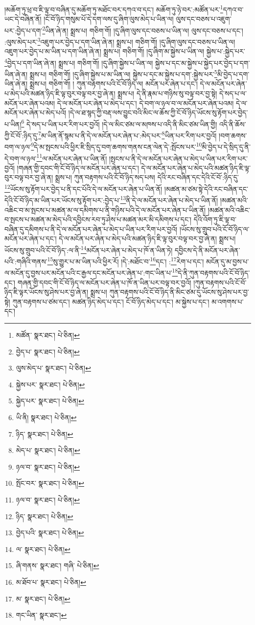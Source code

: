 །མཆོག་ཏུ་ཕྲ་བ་ཇི་ལྟ་བ་བཞིན་དུ་མཆོག་ཏུ་མཐོང་བར་དཀའ་བ་དང་། མཆོག་ཏུ་ཉེ་བར་:མཚོན་པར་\footnote{མཚོན་  སྣར་ཐང་།  པེ་ཅིན། }དཀའ་བ་ཡང་དེ་བཞིན་ནོ། །ངོ་བོ་ཉིད་གསུམ་པོ་དེ་དག་ལས་དུ་ཞིག་ལུས་མེད་པ་ཡིན་ལ། ལུས་དང་བཅས་པ་འཇུག་པར་:བྱེད་པ་དག་\footnote{བྱེད་པ་  སྣར་ཐང་།  པེ་ཅིན། }ཡིན་ཞེ་ན། སྨྲས་པ། གཅིག་གོ། །དུ་ཞིག་ལུས་དང་བཅས་པ་ཡིན་ལ། ལུས་དང་བཅས་པ་དང་། :ལུས་མེད་པར་\footnote{ལུས་མེད་པ་  སྣར་ཐང་།  པེ་ཅིན། }འཇུག་པར་བྱེད་པ་དག་ཡིན་ཞེ་ན། སྨྲས་པ། གཅིག་གོ། །དུ་ཞིག་ལུས་དང་བཅས་པ་ཡིན་ལ། འཇུག་པར་བྱེད་པ་མ་ཡིན་པ་དག་ཡིན་ཞེ་ན། སྨྲས་པ། གཅིག་གོ། །དུ་ཞིག་མ་སྐྱེས་པ་ཡིན་ལ། སྐྱེས་པ་:སྐྱེད་པར་\footnote{སྐྱེས་པར་  སྣར་ཐང་།  པེ་ཅིན། }བྱེད་པ་དག་ཡིན་ཞེ་ན། སྨྲས་པ། གཅིག་གོ། །དུ་ཞིག་སྐྱེས་པ་ཡིན་ལ། སྐྱེས་པ་དང་མ་སྐྱེས་པ་སྐྱེད་པར་བྱེད་པ་དག་ཡིན་ཞེ་ན། སྨྲས་པ། གཅིག་གོ། །དུ་ཞིག་སྐྱེས་པ་མ་ཡིན་ལ། སྐྱེས་པ་དང་མ་སྐྱེས་པ་དག་:སྐྱེས་པར་\footnote{སྐྱེད་པར་  སྣར་ཐང་།  པེ་ཅིན། }མི་བྱེད་པ་དག་ཡིན་ཞེ་ན། སྨྲས་པ། གཅིག་གོ། །
ཀུན་བརྟགས་པའི་ངོ་བོ་ཉིད་ལ། མངོན་པར་ཞེན་པ་དང་། དེ་ལ་མངོན་པར་ཞེན་པ་མེད་པའི་མཚན་ཉིད་ཇི་ལྟ་བུར་བལྟ་བར་བྱ་ཞེ་ན། སྨྲས་པ། དེ་ནི་རྣམ་པ་གཉིས་སུ་བལྟ་བར་བྱ་སྟེ། དེ་སད་པ་ལ་མངོན་པར་ཞེན་པའམ། དེ་ལ་མངོན་པར་ཞེན་པ་མེད་པ་དང་། དེ་བག་ལ་ཉལ་བ་ལ་མངོན་པར་ཞེན་པའམ། དེ་ལ་མངོན་པར་ཞེན་པ་མེད་པའོ། །དེ་ལ་ཐ་སྙད་ཀྱི་བརྡ་ལས་བྱུང་བའི་མིང་ལ་ཆོས་ཀྱི་ངོ་བོ་ཉིད་ཡོངས་སུ་རྟོག་པར་བྱེད་པ་ཡིན།\footnote{ཡི་ནི།  སྣར་ཐང་།  པེ་ཅིན། } དེ་སད་པ་ཡིན་པར་རིག་པར་བྱའོ། །དེ་ལ་མིང་ཙམ་ལ་མཁས་པ་འདི་ནི་མིང་ཙམ་ཡིན་གྱི། འདི་ནི་ཆོས་ཀྱི་ངོ་བོ་:ཉིད་དུ་\footnote{ཉིད་  སྣར་ཐང་།  པེ་ཅིན། }མ་ཡིན་ནོ་སྙམ་པ་ནི་དེ་ལ་མངོན་པར་ཞེན་པ་:མེད་པར་\footnote{མེད་པ་  སྣར་ཐང་།  པེ་ཅིན། }ཡིན་པར་རིག་པར་བྱའོ། །བག་ཆགས་བག་ལ་ཉལ་\footnote{ཉལ་བ་  སྣར་ཐང་།  པེ་ཅིན། }དེ་མ་སྤངས་པའི་ཕྱིར་ཇི་སྲིད་དུ་བག་ཆགས་གནས་ངན་ལེན་དེ་:སྤོངས་པར་\footnote{སྤོང་བར་  སྣར་ཐང་།  པེ་ཅིན། }མི་བྱེད་པ་དེ་སྲིད་དུ་ནི་དེ་བག་ལ་ཉལ་\footnote{ཉལ་བ་  སྣར་ཐང་།  པེ་ཅིན། }ལ་མངོན་པར་ཞེན་པ་ཡིན་ནོ། །སྤངས་པ་ནི་དེ་ལ་མངོན་པར་ཞེན་པ་མེད་པ་ཡིན་པར་རིག་པར་བྱའོ། །གཞན་གྱི་དབང་གི་ངོ་བོ་ཉིད་ལ་མངོན་པར་ཞེན་པ་དང་། དེ་ལ་མངོན་པར་ཞེན་པ་མེད་པའི་མཚན་ཉིད་ཇི་ལྟ་བུར་བལྟ་བར་བྱ་ཞེ་ན། སྨྲས་པ། ཀུན་བརྟགས་པའི་ངོ་བོ་ཉིད་སད་པས། དེའི་རང་བཞིན་དང་དེའི་ངོ་བོ་:ཉིད་དུ་\footnote{ཉིད་  སྣར་ཐང་།  པེ་ཅིན། }ཡོངས་སུ་རྟོག་པར་བྱེད་པ་ནི་དང་པོའི་དེ་ལ་མངོན་པར་ཞེན་པ་ཡིན་ནོ། །མཚན་མ་ཙམ་སྟེ་དེའི་རང་བཞིན་དང་དེའི་ངོ་བོ་ཉིད་མ་ཡིན་པར་ཡོངས་སུ་རྟོག་པར་:བྱེད་པ་\footnote{བྱེད་པའི་  སྣར་ཐང་།  པེ་ཅིན། }ནི་དེ་ལ་མངོན་པར་ཞེན་པ་མེད་པ་ཡིན་ནོ། །མཚན་མའི་འཆིང་བ་མ་སྤངས་པ་མཚན་མ་ལ་དམིགས་པ་ནི་གཉིས་པའི་དེ་ལ་མངོན་པར་ཞེན་པ་ཡིན་ནོ། །མཚན་མའི་འཆིང་བ་སྤངས་པ་མཚན་མ་མེད་པའི་དབྱིངས་རབ་ཏུ་ཤེས་པ་མཚན་མར་མི་དམིགས་པ་དང་། དེའི་འོག་ཏུ་ཇི་ལྟ་བ་བཞིན་དུ་དམིགས་པ་ནི་དེ་ལ་མངོན་པར་ཞེན་པ་མེད་པ་ཡིན་པར་རིག་པར་བྱའོ། །ཡོངས་སུ་གྲུབ་པའི་ངོ་བོ་ཉིད་ལ་མངོན་པར་ཞེན་པ་དང་། དེ་ལ་མངོན་པར་ཞེན་པ་མེད་པའི་མཚན་ཉིད་ཇི་ལྟ་བུར་བལྟ་བར་བྱ་ཞེ་ན། སྨྲས་པ། ཡོངས་སུ་གྲུབ་པའི་ངོ་བོ་ཉིད་:ལ་ནི་\footnote{ལ་  སྣར་ཐང་།  པེ་ཅིན། }མངོན་པར་ཞེན་པ་མེད་པ་ཁོ་ན་ཡིན་ཏེ། དབྱིངས་དེ་ནི་མངོན་པར་ཞེན་པའི་:གཞིའི་གནས་\footnote{ཞི་གནས་  སྣར་ཐང་། གཞི་  པེ་ཅིན། }སུ་གྱུར་པ་མ་ཡིན་པའི་ཕྱིར་རོ། །དེ་:མཐོང་བ་\footnote{མ་ཐོབ་པ་  སྣར་ཐང་།  པེ་ཅིན། }དང་། :\footnote{མ་  སྣར་ཐང་།  པེ་ཅིན། }རེག་པ་དང་། མངོན་དུ་མ་བྱས་པ་ལ་མངོན་དུ་བྱས་པར་མངོན་པའི་ང་རྒྱལ་དང་མངོན་པར་ཞེན་པ་:གང་ཡིན་པ་\footnote{གང་ཡིན་  སྣར་ཐང་། }དེ་ནི་ཀུན་བརྟགས་པའི་ངོ་བོ་ཉིད་དང་། གཞན་གྱི་དབང་གི་ངོ་བོ་ཉིད་ལ་མངོན་པར་ཞེན་པ་ཁོ་ན་ཡིན་པར་བལྟ་བར་བྱའོ། །ཀུན་བརྟགས་པའི་ངོ་བོ་ཉིད་ཇི་ལྟར་ཡོངས་སུ་ཤེས་པར་བྱ་ཞེ་ན། སྨྲས་པ། ཀུན་བརྟགས་པའི་ངོ་བོ་ཉིད་ནི་མིང་ཙམ་དུ་ཡོངས་སུ་ཤེས་པར་བྱ་སྟེ། ཀུན་བརྟགས་པ་ཙམ་དང་། མཚན་ཉིད་མེད་པ་དང་། ངོ་བོ་ཉིད་མེད་པ་དང་། མ་སྐྱེས་པ་དང་། མ་འགགས་པ་དང་། 